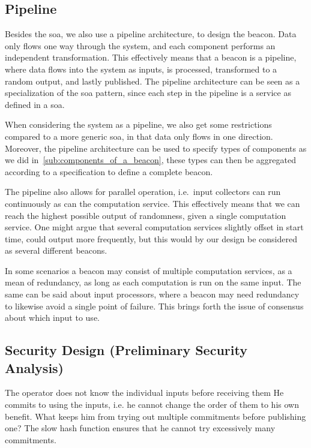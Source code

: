 \subsection{Pipeline}%
\label{sub:pipeline}
Besides the \gls{soa}, we also use a pipeline architecture, to design the beacon.
Data only flows one way through the system, and each component performs an independent transformation.
This effectively means that a beacon is a pipeline, where data flows into the system as inputs, is processed, transformed to a random output, and lastly published.
The pipeline architecture can be seen as a specialization of the \gls{soa} pattern, since each step in the pipeline is a service as defined in a \gls{soa}.

When considering the system as a pipeline, we also get some restrictions compared to a more generic \gls{soa}, in that data only flows in one direction.
Moreover, the pipeline architecture can be used to specify types of components as we did in~\vref{sub:components_of_a_beacon}, these types can then be aggregated according to a specification to define a complete beacon.

The pipeline also allows for parallel operation, i.e.\ input collectors can run continuously as can the computation service.
This effectively means that we can reach the highest possible output of randomness, given a single computation service.
One might argue that several computation services slightly offset in start time, could output more frequently, but this would by our design be considered as several different beacons.

In some scenarios a beacon may consist of multiple computation services, as a mean of redundancy, as long as each computation is run on the same input.
The same can be said about input processors, where a beacon may need redundancy to likewise avoid a single point of failure.
This brings forth the issue of consensus about which input to use.

\subsection{Security Design (Preliminary Security Analysis)}


The operator does not know the individual inputs before receiving them
He commits to using the inputs, i.e. he cannot change the order of them to his own benefit. What keeps him from trying out multiple commitments before publishing one?
The slow hash function ensures that he cannot try excessively many commitments.
